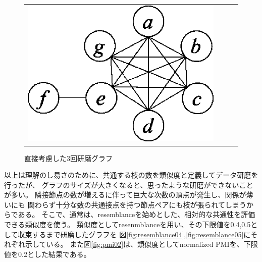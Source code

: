 \begin{figure}[htbp]
\begin{center}
\begin{tabular}{cccc}
\begin{minipage}{0.25\hsize}
\begin{center}
\includegraphics[scale=0.5]{./polished3.eps}
\caption{直接考慮した3回研磨グラフ\label{fig:polished3}}
\end{center}
\end{minipage}

\end{tabular}
\end{center}
\end{figure}

以上は理解のし易さのために、共通する枝の数を類似度と定義してデータ研磨を行ったが、
グラフのサイズが大きくなると、思ったような研磨ができないことが多い。
隣接節点の数が増えるに伴って巨大な次数の頂点が発生し、関係が薄いにも
関わらず十分な数の共通接点を持つ節点ペアにも枝が張られてしまうからである。
そこで、通常は、resemblanceを始めとした、相対的な共通性を評価できる類似度を使う。
類似度としてresenmblanceを用い、その下限値を0.4,0.5として収束するまで研磨したグラフを
図\ref{fig:resemblance04},\ref{fig:resemblance05}にそれぞれ示している。
また図\ref{fig:pmi02}は、類似度としてnormalized PMIを、下限値を0.2とした結果である。

